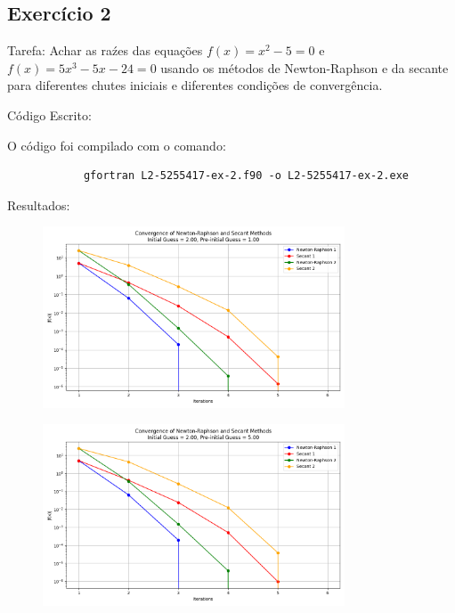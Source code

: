 \documentclass[12pt, a4paper]{article} %
\begin{document}
    \subsection{Exerc\'icio 2}

        Tarefa: Achar as ra\'zes das equa\c{c}\~oes $f(x) = x^2 - 5 = 0$ e $f(x) = 5x^3 - 5x - 24 = 0$ usando os m\'etodos de Newton-Raphson e da secante para diferentes chutes iniciais e diferentes condi\c{c}\~oes de converg\^encia.

        C\'odigo Escrito:
        

        O c\'odigo foi compilado com o comando:
        \begin{verbatim}
            gfortran L2-5255417-ex-2.f90 -o L2-5255417-ex-2.exe
        \end{verbatim}

        Resultados:

        \begin{figure}[H]
            \centering
            \includegraphics[width=0.8\textwidth]{../images/convergence-initial-20-preinitial-10.png}
            \caption{}
        \end{figure}

        \begin{figure}[H]
            \centering
            \includegraphics[width=0.8\textwidth]{../images/convergence-initial-20-preinitial-50.png}
            \caption{}
        \end{figure}
        
\end{document}
